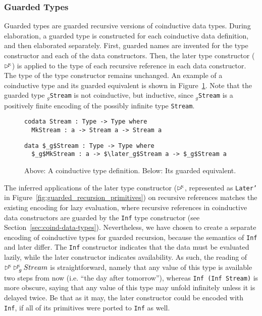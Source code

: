 
\subsubsection{Guarded Types}
\label{sec:guarded-types}
Guarded types are guarded recursive versions of coinductive data types. During
elaboration, a guarded type is constructed for each coinductive data definition,
and then elaborated separately. First, guarded names are invented for the type constructor and
each of the data constructors. Then, the later type constructor ($\rhd^{\!\!\kappa}$)
is applied to the type of each recursive reference in each data
constructor. The type of the type constructor remains unchanged. An example of a
coinductive type and its guarded equivalent is shown in
Figure~\ref{fig:guarded_stream_inf}. Note that the guarded type \texttt{$_g$Stream} is not coinductive, but
inductive, since \texttt{$_g$Stream} is a positively finite encoding of the
possibly infinite type \texttt{Stream}.

\begin{figure}[h]
\begin{lstlisting}[mathescape]
codata Stream : Type -> Type where
  MkStream : a -> Stream a -> Stream a
\end{lstlisting}
\begin{lstlisting}[mathescape]
data $_g$Stream : Type -> Type where
  $_g$MkStream : a -> $\later_g$Stream a -> $_g$Stream a
\end{lstlisting}
  \caption{Above: A coinductive type definition. Below: Its guarded equivalent.}
  \label{fig:guarded_stream_inf}
\end{figure}

The inferred applications of the later type constructor ($\rhd^{\!\!\kappa}$, represented
as \texttt{Later'} in Figure~\ref{fig:guarded_recursion_primitives}) on
recursive references matches the existing encoding for lazy evaluation, where
recursive references in coinductive data constructors are guarded by the
\texttt{Inf} type constructor (see
Section~\ref{sec:coind-data-types}). Nevertheless, we have chosen to create a
separate encoding of coinductive types for guarded recursion, because the
semantics of \texttt{Inf} and later differ. The \texttt{Inf} constructor
indicates that the data must be evaluated lazily, while the later constructor
indicates availability. As such, the reading of
$\rhd^{\!\!\kappa}\rhd^{\!\!\kappa} _{g}Stream$ is straightforward, namely that any value of
this type is available two steps from now (i.e. ``the day after tomorrow''),
whereas \texttt{Inf (Inf Stream)} is more obscure, saying that any value of this
type may unfold infinitely unless it is delayed twice. Be that as it may, the
later constructor could be encoded with \texttt{Inf}, if all of its primitives
were ported to \texttt{Inf} as well.

